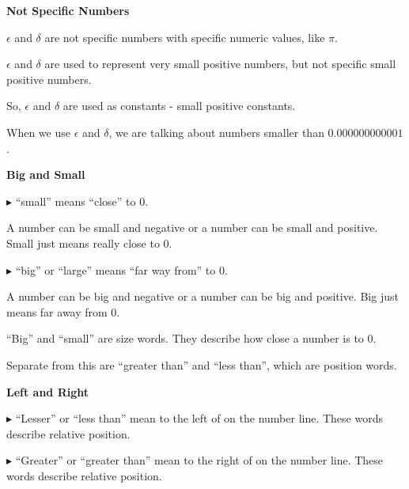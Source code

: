 \documentclass{ximera}
\begin{document}
\begin{warning} \textbf{\textcolor{red!70!black}{Not Specific Numbers}} 


$\epsilon$ and $\delta$ are not specific numbers with specific numeric values, like $\pi$. 


$\epsilon$ and $\delta$ are used to represent very small positive numbers, but not specific small positive numbers. 


So, $\epsilon$ and $\delta$ are used as constants - small positive constants.


When we use $\epsilon$ and $\delta$, we are talking about numbers smaller than $0.000000000001$. 


\end{warning}















\begin{idea} \textbf{\textcolor{blue!55!black}{Big and Small}} 

\textbf{\textcolor{blue!55!black}{$\blacktriangleright$}}  ``small'' means ``close'' to $0$. 


A number can be small and negative or a number can be small and positive. Small just means really close to $0$. 


\textbf{\textcolor{blue!55!black}{$\blacktriangleright$}}  ``big'' or ``large'' means ``far way from'' to $0$. 


A number can be big and negative or a number can be big and positive. Big just means far away from $0$. 


\end{idea}


``Big'' and ``small'' are size words.  They describe how close a number is to $0$. 

Separate from this are ``greater than'' and ``less than'', which are position words. 





\newpage


\begin{idea} \textbf{\textcolor{blue!55!black}{Left and Right}} 


\textbf{\textcolor{blue!55!black}{$\blacktriangleright$}} ``Lesser'' or ``less than'' mean to the left of on the number line. These words describe relative position.


\textbf{\textcolor{blue!55!black}{$\blacktriangleright$}} ``Greater'' or ``greater than'' mean to the right of on the number line. These words describe relative position.




\end{idea}
\end{document}
